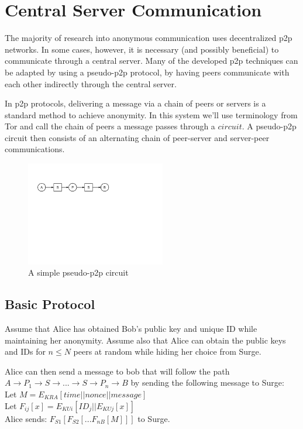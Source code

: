 \documentclass[twocolumn]{paper}
\begin{document}
\section{Central Server Communication}
 The majority of research into anonymous communication uses decentralized p2p networks. In some cases, however, it is necessary (and possibly beneficial) to communicate through a central server. Many of the developed p2p techniques can be adapted by using a pseudo-p2p protocol, by having peers communicate with each other indirectly through the central server. 

 In p2p protocols, delivering a message via a chain of peers or servers is a standard method to achieve anonymity. In this system we'll use terminology from Tor and call the chain of peers a message passes through a $circuit$. A pseudo-p2p circuit then consists of an alternating chain of peer-server and server-peer communications.

\begin{figure}[ht]
  \includegraphics[width=230px]{PSP.png}
  \caption{A simple pseudo-p2p circuit}
\end{figure}

\subsection{Basic Protocol}
Assume that Alice has obtained Bob's public key and unique ID while maintaining her anonymity. Assume also that Alice can obtain the public keys and IDs for $n \le N$ peers at random while hiding her choice from Surge. 

Alice can then send a message to bob that will follow the path $A \rightarrow P_1 \rightarrow S \rightarrow ... \rightarrow S \rightarrow P_n \rightarrow B$ by sending the following message to Surge: 
\\
Let $M = E_{KRA}[  time || nonce || message ]$
\\Let $F_{ij}[x] = E_{KUi}[ ID_j || E_{KUj}[ x ] ]$
\\
Alice sends: $F_{S1}[F_{S2}[...F_{nB}[ M ]]]$ to Surge. 
\end{document}
